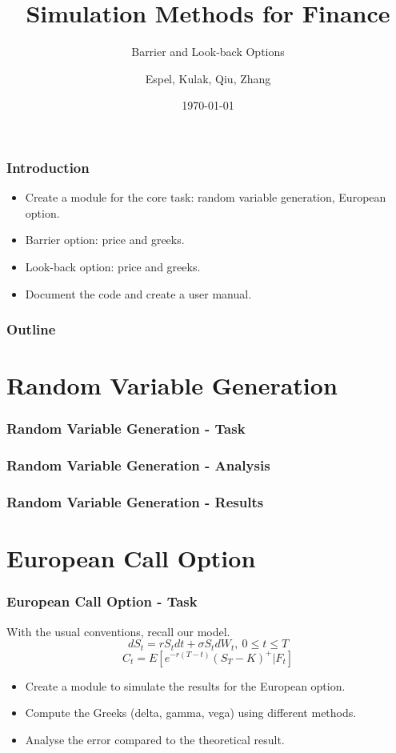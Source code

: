 \documentclass[12pt]{beamer}
\title{Simulation Methods for Finance}
\subtitle{Barrier and Look-back Options}
\author{Espel, Kulak, Qiu, Zhang}
\institute{Imperial College London}
\date{\today}
\begin{document}
\begin{frame}
    \titlepage
\end{frame}


\begin{frame}
\frametitle{Introduction}
\begin{itemize}
  \item Create a module for the core task: random variable generation, European option.
  \item Barrier option: price and greeks.
  \item Look-back option: price and greeks.
  \item Document the code and create a user manual.
\end{itemize}
\end{frame}



\begin{frame}
\frametitle{Outline}
\tableofcontents
\end{frame}


\section{Random Variable Generation}
\begin{frame}
\frametitle{Random Variable Generation - Task}

\end{frame}

\begin{frame}
\frametitle{Random Variable Generation - Analysis}

\end{frame}

\begin{frame}
\frametitle{Random Variable Generation - Results}

\end{frame}



\section{European Call Option}
\begin{frame}
\frametitle{European Call Option - Task}

With the usual conventions, recall our model.
$$dS_t=rS_tdt+\sigma S_tdW_t, \ 0\leq t \leq T$$
$$C_t = E[e^{-r(T-t)}(S_T-K)^+|\textit{F}_t]$$

\begin{itemize}
  \item Create a module to simulate the results for the European option.
  \item Compute the Greeks (delta, gamma, vega) using different methods.
  \item Analyse the error compared to the theoretical result.
\end{itemize}
\end{frame}
\end{document}
